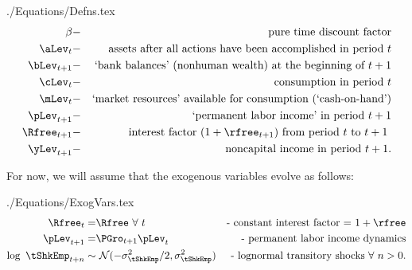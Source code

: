 \documentclass[titlepage]{\econtex}
\begin{document}
\begin{verbatimwrite}{./Equations/Defns.tex}
  \begin{equation*}\begin{gathered}\begin{aligned}
    {\DiscAlt} & - & \text{pure time discount factor} \\
    {\aLev}_{t} & - & \text{assets after all actions have been accomplished in period $t$} \\
    {\bLev}_{t+1} & - & \text{`bank balances' (nonhuman wealth) at the beginning of $t+1$} \\
    {\cLev}_{t} & - & \text{consumption in period $t$} \\
    {\mLev}_{t} & - & \text{`market resources' available for consumption (`cash-on-hand')} \\
    \pLev_{t+1} & - & \text{`permanent labor income' in period $t+1$} \\
    \Rfree_{t+1} & - & \text{interest factor $(1+\rfree_{t+1})$ from period $t$ to $t+1$ } \\
    {\yLev}_{t+1} & - & \text{noncapital income in period $t+1$}.
  \end{aligned}\end{gathered}\end{equation*}
\end{verbatimwrite}


For now, we will assume that the exogenous variables evolve as follows: 
\begin{verbatimwrite}{./Equations/ExogVars.tex}
  \begin{equation}\begin{gathered}\begin{aligned}
    \Rfree_{t}   = & \Rfree~\forall~t & \text{- constant interest factor = $1+\rfree$}  \notag
    \\ \pLev_{t+1}  = & \PGro_{t+1}\pLev_{t} &   \text{- permanent labor income dynamics} \label{eq:permincgrow} 
    \\ \log ~ \tShkEmp_{t+n} \sim &  ~\mathcal{N}(-\sigma_{\tShkEmp}^{2}/2,\sigma_{\tShkEmp}^{2}) & \text{- lognormal transitory shocks}~\forall~n>0 \notag
                                                                                                    \label{eq:epsdist}
                                                                                                    .
  \end{aligned}\end{gathered}\end{equation}
\end{verbatimwrite}

\end{document}
